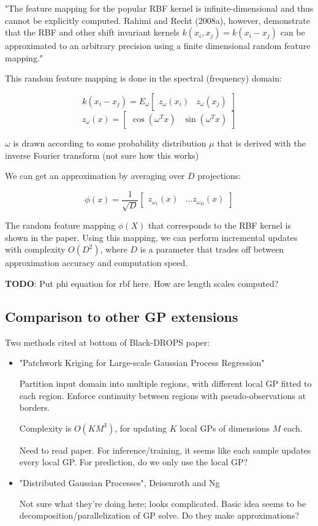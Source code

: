 \documentclass[a4paper]{article}
\begin{document}
"The feature mapping for the popular RBF kernel is infinite-dimensional and thus cannot be explicitly computed. Rahimi and Recht
(2008a), however, demonstrate that the RBF and other shift 
invariant kernels $k(x_i, x_j) = k(x_i − x_j)$ can be approximated to an arbitrary precision using a finite dimensional random feature mapping."

This random feature mapping is done in the spectral (frequency) domain: 

$$k(x_i - x_j) = E_\omega\begin{bmatrix}z_\omega(x_i) & z_\omega(x_j) \end{bmatrix}$$
$$z_\omega(x) = \begin{bmatrix}\cos(\omega^T x) & \sin(\omega^T x)  \end{bmatrix}$$

$\omega$ is drawn according to some probability distribution $\mu$ that is derived with the inverse Fourier transform (not sure how this works)

We can get an approximation by averaging over $D$ projections:

$$\phi(x) = \frac{1}{\sqrt{D}} \begin{bmatrix}z_{\omega_1}(x) & \ldots z_{\omega_D}(x) \end{bmatrix}$$

The random feature mapping $\phi(X)$ that corresponds to the RBF kernel is shown in the paper. Using this mapping, we can perform incremental updates with complexity $O(D^2)$, where $D$ is a parameter that trades off between approximation accuracy and computation speed.

\textbf{TODO}: Put phi equation for rbf here. How are length scales computed?

\subsection*{Comparison to other GP extensions}

Two methods cited at bottom of Black-DROPS paper:

\begin{itemize}
	\item "Patchwork Kriging for Large-scale Gaussian Process Regression"
    
    Partition input domain into multiple regions, with different local GP fitted to each region. Enforce continuity between regions with pseudo-observations at borders. 
    
    Complexity is $O(KM^3)$, for updating $K$ local GPs of dimensions $M$ each. 
    
    Need to read paper. For inference/training, it seems like each sample updates every local GP. For prediction, do we only use the local GP? 
    
    \item "Distributed Gaussian Processes", Deisenroth and Ng 
    
    Not sure what they're doing here; looks complicated. Basic idea seems to be decomposition/parallelization of GP solve. Do they make approximations? 

\end{itemize}
\end{document}
